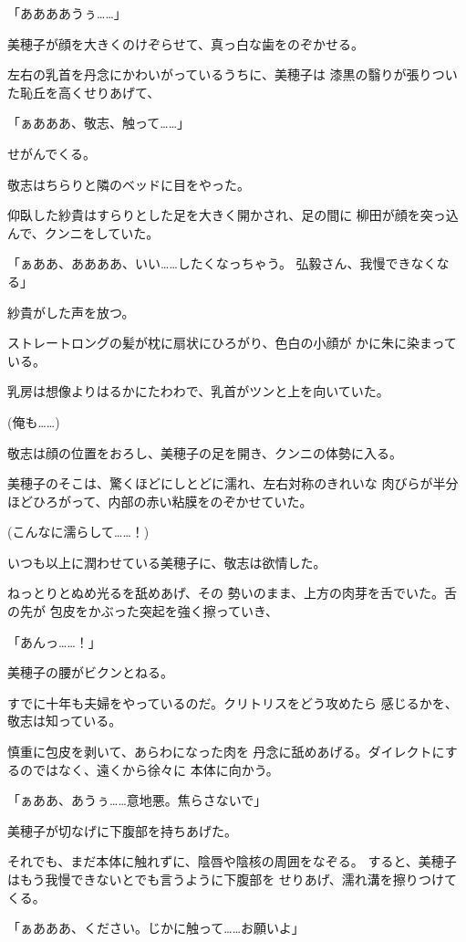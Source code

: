 ﻿\documentclass[
    book,tate,
    line_length=30zw,
    jafontsize=12pt,
    paper=b5j,
    landscape,
    ]{jlreq}
\begin{document}
「ああああうぅ……」

美穂子が顔を大きくのけぞらせて、真っ白な歯をのぞかせる。

左右の乳首を丹念にかわいがっているうちに、美穂子は
漆黒の翳りが張りついた恥丘を高くせりあげて、

「ぁあああ、敬志、触って……」

せがんでくる。

敬志はちらりと隣のベッドに目をやった。

仰臥した紗貴はすらりとした足を大きく開かされ、足の間に
柳田が顔を突っ込んで、クンニをしていた。

「ぁああ、ああああ、いい……したくなっちゃう。
弘毅さん、我慢できなくなる」

紗貴がした声を放つ。

ストレートロングの髪が枕に扇状にひろがり、色白の小顔が
かに朱に染まっている。

乳房は想像よりはるかにたわわで、乳首がツンと上を向いていた。

(俺も……)

敬志は顔の位置をおろし、美穂子の足を開き、クンニの体勢に入る。

美穂子のそこは、驚くほどにしとどに濡れ、左右対称のきれいな
肉びらが半分ほどひろがって、内部の赤い粘膜をのぞかせていた。

(こんなに濡らして……！)

いつも以上に潤わせている美穂子に、敬志は欲情した。

ねっとりとぬめ光るを舐めあげ、その
勢いのまま、上方の肉芽を舌でいた。舌の先が
包皮をかぶった突起を強く擦っていき、

「あんっ……！」

美穂子の腰がビクンとねる。

すでに十年も夫婦をやっているのだ。クリトリスをどう攻めたら
感じるかを、敬志は知っている。

慎重に包皮を剥いて、あらわになった肉を
丹念に舐めあげる。ダイレクトにするのではなく、遠くから徐々に
本体に向かう。

「ぁああ、あうぅ……意地悪。焦らさないで」

美穂子が切なげに下腹部を持ちあげた。

それでも、まだ本体に触れずに、陰唇や陰核の周囲をなぞる。
すると、美穂子はもう我慢できないとでも言うように下腹部を
せりあげ、濡れ溝を擦りつけてくる。

「ぁあああ、ください。じかに触って……お願いよ」
\end{document}

